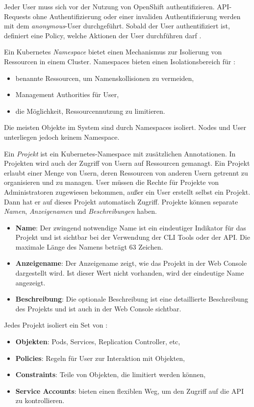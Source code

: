 Jeder User muss sich vor der Nutzung von OpenShift authentifizieren. API-Requests ohne Authentifizierung oder einer invaliden Authentifizierung werden mit dem \textit{anonymous}-User durchgeführt. Sobald der User authentifiziert ist, definiert eine Policy, welche Aktionen der User durchführen darf \cite{OpenShiftOnline}.

Ein Kubernetes \textit{Namespace} bietet einen Mechanismus zur Isolierung von Ressourcen in einem Cluster. Namespaces bieten einen Isolationsbereich für \cite{OpenShiftOnline}:
\begin{itemize}
	\item benannte Ressourcen, um Namenskollisionen zu vermeiden,
	\item Management Authorities für User,
	\item die Möglichkeit, Ressourcennutzung zu limitieren.
\end{itemize}
Die meisten Objekte im System sind durch Namespaces isoliert. Nodes und User unterliegen jedoch keinem Namespace.

Ein \textit{Projekt} ist ein Kubernetes-Namespace mit zusätzlichen Annotationen. In Projekten wird auch der Zugriff von Usern auf Ressourcen gemanagt. Ein Projekt erlaubt einer Menge von Usern, deren Ressourcen von anderen Usern getrennt zu organisieren und zu managen. User müssen die Rechte für Projekte von Administratoren zugewiesen bekommen, außer ein User erstellt selbst ein Projekt. Dann hat er auf dieses Projekt automatisch Zugriff.
Projekte können separate \textit{Namen}, \textit{Anzeigenamen} und \textit{Beschreibungen} haben.
\begin{itemize}
	\item \textbf{Name}: Der zwingend notwendige Name ist ein eindeutiger Indikator für das Projekt und ist sichtbar bei der Verwendung der CLI Tools oder der API. Die maximale Länge des Namens beträgt 63 Zeichen.
	\item \textbf{Anzeigename}: Der Anzeigename zeigt, wie das Projekt in der Web Console dargestellt wird. Ist dieser Wert nicht vorhanden, wird der eindeutige Name angezeigt.
	\item \textbf{Beschreibung}: Die optionale Beschreibung ist eine detaillierte Beschreibung des Projekts und ist auch in der Web Console sichtbar.
\end{itemize}

Jedes Projekt isoliert ein Set von \cite{OpenShiftOnline}:
\begin{itemize}
	\item \textbf{Objekten}: Pods, Services, Replication Controller, etc,
	\item \textbf{Policies}: Regeln für User zur Interaktion mit Objekten,
	\item \textbf{Constraints}: Teile von Objekten, die limitiert werden können,
	\item \textbf{Service Accounts}: bieten einen flexiblen Weg, um den Zugriff auf die API zu kontrollieren.
\end{itemize}

